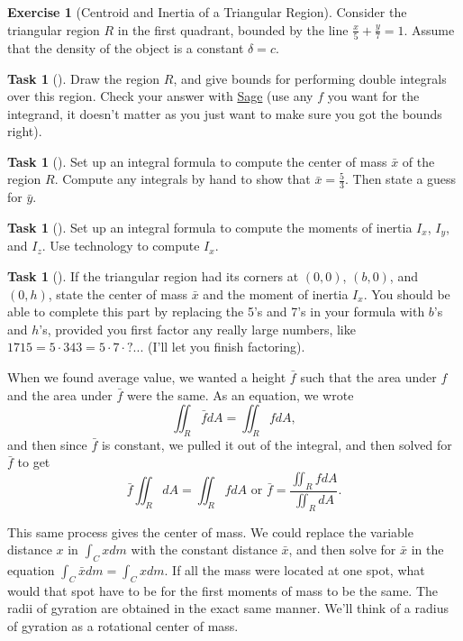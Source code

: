 \documentclass[10pt,]{book}
\theoremstyle{plain}
\theoremstyle{definition}
\theoremstyle{definition}
\theoremstyle{definition}
\theoremstyle{definition}
\newtheorem{exploration}[project]{Exercise}
\newtheorem{task}[project]{Task}
\theoremstyle{definition}
\numberwithin{equation}{section}
\newcommand{\sageDoubleIntegralCheckerURL}{http://bmw.byuimath.com/dokuwiki/doku.php?id=double_integral_calculator}
\newcommand{\ds}{\displaystyle}
\begin{document}
\begin{exploration}[Centroid and Inertia of a Triangular Region]\label{exploration-255}
Consider the triangular region \(R\) in the first quadrant, bounded by the line \(\ds \frac{x}{5}+\frac{y}{7}=1\). Assume that the density of the object is a constant \(\delta = c\).%
\begin{task}[]\label{task-695}
Draw the region \(R\), and give bounds for performing double integrals over this region. Check your answer with \href{\\sageDoubleIntegralCheckerURL}{Sage} (use any \(f\) you want for the integrand, it doesn't matter as you just want to make sure you got the bounds right).%
\end{task}
\begin{task}[]\label{task-696}
Set up an integral formula to compute the center of mass \(\bar x\) of the region \(R\).  Compute any integrals by hand to show that \(\bar x = \frac{5}{3}\).  Then state a guess for \(\bar y\).%
\end{task}
\begin{task}[]\label{task-697}
Set up an integral formula to compute the moments of inertia \(I_x\), \(I_y\), and \(I_z\).  Use technology to compute \(I_x\).%
\end{task}
\begin{task}[]\label{task-698}
If the triangular region had its corners at \((0,0)\), \((b,0)\), and \((0,h)\), state the center of mass \(\bar x\) and the moment of inertia \(I_x\). You should be able to complete this part by replacing the 5's and 7's in your formula with \(b\)'s and \(h\)'s, provided you first factor any really large numbers, like \(1715 = 5\cdot 343=5\cdot 7\cdot ?...\) (I'll let you finish factoring).%
\end{task}
\end{exploration}
When we found average value, we wanted a height \(\bar f\) such that the area under \(f\) and the area under \(\bar f\) were the same. As an equation, we wrote%
\begin{equation*}
\iint_R \bar f dA = \iint_R f dA,
\end{equation*}
and then since \(\bar f\) is constant, we pulled it out of the integral, and then solved for \(\bar f\) to get%
\begin{equation*}
\bar f \iint_R dA = \iint_R f dA 
\text{ or }  
\bar f  = \frac{\iint_R f dA }{\iint_R dA}
.
\end{equation*}
%
\par
This same process gives the center of mass. We could replace the variable distance \(x\) in \(\int_C x dm\) with the constant distance \(\bar x\), and then solve for \(\bar x\) in the equation \(\int_C \bar xdm = \int_C x dm\). If all the mass were located at one spot, what would that spot have to be for the first moments of mass to be the same. The radii of gyration are obtained in the exact same manner. We'll think of a radius of gyration as a rotational center of mass.%
\end{document}
